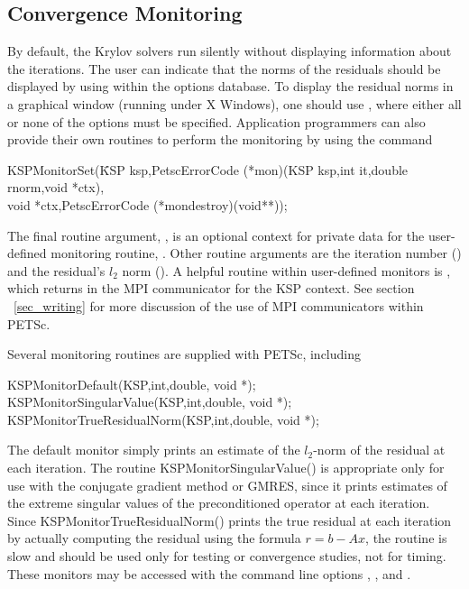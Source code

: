 \subsection{Convergence Monitoring}
\label{sec_kspmonitor}

By default, the Krylov solvers run silently without displaying information
about the iterations. The user can indicate that the norms of the residuals
should be displayed by using 
 within the options database.
To display the residual norms in a graphical window (running under X Windows),
one should use  \trl{[x,y,w,h]}, where either all or none of
the options must be specified. 
Application programmers can also provide their own routines to perform
the monitoring by using the command
\begin{tabbing}
  KSPMonitorSet(\=KSP ksp,PetscErrorCode (*mon)(KSP ksp,int it,double rnorm,void *ctx),\\
                \>        void *ctx,PetscErrorCode (*mondestroy)(void**));
\end{tabbing}
The final routine argument, , is an optional context for private
data for the user-defined monitoring routine, .  Other
 routine arguments are the iteration
number () and the residual's $ l_2 $ norm ().
A helpful routine within user-defined monitors is
, which returns
in   the
MPI communicator for the KSP context.  See section ~\ref{sec_writing}
for more discussion of the use of MPI communicators within PETSc.

Several monitoring routines are supplied with PETSc,
including
\begin{tabbing}
  KSPMonitorDefault(KSP,int,double, void *);\\
  KSPMonitorSingularValue(KSP,int,double, void *);\\
  KSPMonitorTrueResidualNorm(KSP,int,double, void *);
\end{tabbing}
The default monitor simply prints an estimate of the $l_2$-norm of the
residual at each iteration. The routine
KSPMonitorSingularValue() is appropriate only for use with the conjugate
gradient method or GMRES, since it prints estimates of the extreme singular
values of the preconditioned operator at each iteration. Since
KSPMonitorTrueResidualNorm() prints
the true residual at each iteration by
actually computing the residual using the formula $ r = b - Ax $, the routine
is slow and should be used only for testing or convergence studies,
not for timing. These monitors may be accessed with the command line options
, , and .
  

